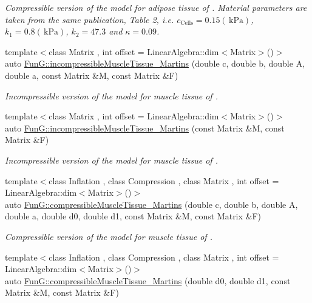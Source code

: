 \begin{DoxyCompactItemize}
\begin{DoxyCompactList}\small\item\em Compressible version of the model for adipose tissue of \cite{Sommer2013}. Material parameters are taken from the same publication, Table 2, i.\+e. $c_\mathrm{Cells}=0.15 (\,\mathrm{kPa})$, $k_1=0.8 (\,\mathrm{kPa})$, $k_2=47.3$ and $\kappa=0.09$. \end{DoxyCompactList}\item 
{\footnotesize template$<$class Matrix , int offset = Linear\+Algebra\+::dim$<$\+Matrix$>$()$>$ }\\auto \hyperlink{group__Biomechanics_gafcc36a1958899ca9246c4c1b3c9bfd85}{Fun\+G\+::incompressible\+Muscle\+Tissue\+\_\+\+Martins} (double c, double b, double A, double a, const Matrix \&M, const Matrix \&F)
\begin{DoxyCompactList}\small\item\em Incompressible version of the model for muscle tissue of \cite{Martins1998}. \end{DoxyCompactList}\item 
{\footnotesize template$<$class Matrix , int offset = Linear\+Algebra\+::dim$<$\+Matrix$>$()$>$ }\\auto \hyperlink{group__Biomechanics_ga9e414585a90b1988e9fa88d17d875055}{Fun\+G\+::incompressible\+Muscle\+Tissue\+\_\+\+Martins} (const Matrix \&M, const Matrix \&F)
\begin{DoxyCompactList}\small\item\em Incompressible version of the model for muscle tissue of \cite{Martins1998}. \end{DoxyCompactList}\item 
{\footnotesize template$<$class Inflation , class Compression , class Matrix , int offset = Linear\+Algebra\+::dim$<$\+Matrix$>$()$>$ }\\auto \hyperlink{group__Biomechanics_gad831914c493a3da04ed40c3c0ce87a62}{Fun\+G\+::compressible\+Muscle\+Tissue\+\_\+\+Martins} (double c, double b, double A, double a, double d0, double d1, const Matrix \&M, const Matrix \&F)
\begin{DoxyCompactList}\small\item\em Compressible version of the model for muscle tissue of \cite{Martins1998}. \end{DoxyCompactList}\item 
{\footnotesize template$<$class Inflation , class Compression , class Matrix , int offset = Linear\+Algebra\+::dim$<$\+Matrix$>$()$>$ }\\auto \hyperlink{group__Biomechanics_ga46a70ccb2285e12addad87b6a8aaaae8}{Fun\+G\+::compressible\+Muscle\+Tissue\+\_\+\+Martins} (double d0, double d1, const Matrix \&M, const Matrix \&F)

\end{DoxyCompactItemize}
